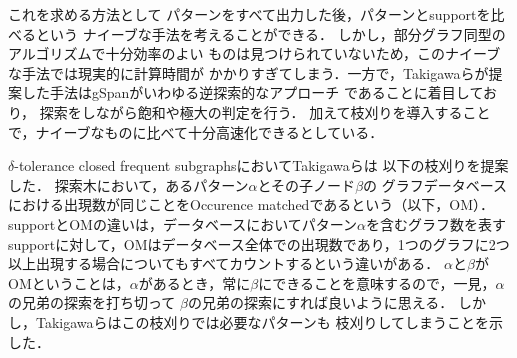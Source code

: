 \documentclass[12pt,fleqn]{jsotsuron}
\begin{document}
これを求める方法として
パターンをすべて出力した後，パターンとsupportを比べるという
ナイーブな手法を考えることができる．
しかし，部分グラフ同型のアルゴリズムで十分効率のよい
ものは見つけられていないため，このナイーブな手法では現実的に計算時間が
かかりすぎてしまう．一方で，Takigawaらが提案した手法はgSpanがいわゆる逆探索的なアプローチ
であることに着目しており， 探索をしながら飽和や極大の判定を行う．
加えて枝刈りを導入することで，ナイーブなものに比べて十分高速化できるとしている\cite{deltol}．

$\delta$-tolerance closed frequent subgraphsにおいてTakigawaらは
以下の枝刈りを提案した．
探索木において，あるパターン$\alpha$とその子ノード$\beta$の
グラフデータベースにおける出現数が同じことをOccurence matchedであるという（以下，OM）．
supportとOMの違いは，データベースにおいてパターン$\alpha$を含むグラフ数を表すsupportに対して，OMはデータベース全体での出現数であり，1つのグラフに2つ以上出現する場合についてもすべてカウントするという違いがある．
$\alpha$と$\beta$がOMということは，$\alpha$があるとき，常に$\beta$にできることを意味するので，一見，$\alpha$の兄弟の探索を打ち切って
$\beta$の兄弟の探索にすれば良いように思える．
しかし，Takigawaらはこの枝刈りでは必要なパターンも
枝刈りしてしまうことを示した．
\end{document}
